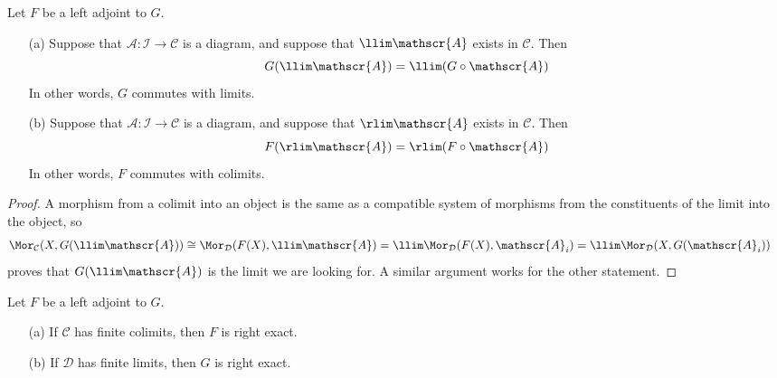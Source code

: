 \begin{theorem}\label{radjoint limit}
Let $F$ be a left adjoint to $G$.
\begin{enumerate}
\item[(a)] Suppose that $\mathscr{A}:\mathcal{I}\to\mathcal{C}$ is a diagram, and suppose that $\llim\mathscr{A}$ exists in $\mathcal{C}$. Then 
\[G(\llim\mathscr{A})=\llim(G\circ\mathscr{A})\]
In other words, $G$ commutes with limits.
\item[(b)] Suppose that $\mathscr{A}:\mathcal{I}\to\mathcal{C}$ is a diagram, and suppose that $\rlim\mathscr{A}$ exists in $\mathcal{C}$. Then 
\[F(\rlim\mathscr{A})=\rlim(F\circ\mathscr{A})\]
In other words, $F$ commutes with colimits.
\end{enumerate}
\end{theorem}
\begin{proof}
A morphism from a colimit into an object is the same as a compatible system of morphisms from the constituents of the limit into the object, so
\begin{align*}
\Mor_{\mathcal{C}}(X,G(\llim\mathscr{A}))&\cong\Mor_{\mathcal{D}}(F(X),\llim\mathscr{A})=\llim\Mor_{\mathcal{D}}(F(X),\mathscr{A}_i)=\llim\Mor_{\mathcal{D}}(X,G(\mathscr{A}_i))
\end{align*}
proves that $G(\llim\mathscr{A})$ is the limit we are looking for. A similar argument works for the other statement.
\end{proof}
\begin{corollary}
Let $F$ be a left adjoint to $G$.
\begin{enumerate}
\item[(a)] If $\mathcal{C}$ has finite colimits, then $F$ is right exact. 
\item[(b)] If $\mathcal{D}$ has finite limits, then $G$ is right exact. 
\end{enumerate}
\end{corollary}
